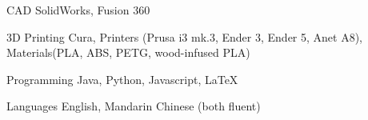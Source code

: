 


\begin{cvskills}


\cvskill
{CAD} %
{SolidWorks, Fusion 360} %


\cvskill
{3D Printing} %
{Cura, Printers (Prusa i3 mk.3, Ender 3, Ender 5, Anet A8), Materials(PLA, ABS, PETG, wood-infused PLA)} %


\cvskill
{Programming} %
{Java, Python, Javascript, LaTeX} %

\cvskill
{Languages}
{English, Mandarin Chinese (both fluent)}


\end{cvskills}